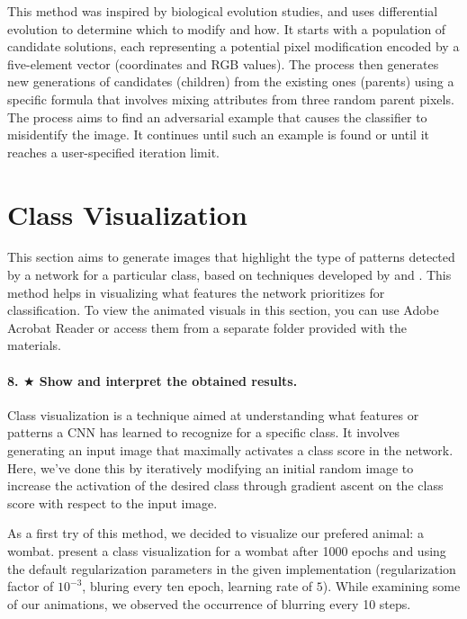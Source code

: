 This method was inspired by biological evolution studies, and uses differential evolution to determine which to modify and how. It starts with a population of candidate solutions, each representing a potential pixel modification encoded by a five-element vector (coordinates and RGB values). The process then generates new generations of candidates (children) from the existing ones (parents) using a specific formula that involves mixing attributes from three random parent pixels. The process aims to find an adversarial example that causes the classifier to misidentify the image. It continues until such an example is found or until it reaches a user-specified iteration limit.

\section{Class Visualization}

This section aims to generate images that highlight the type of patterns detected by a network for a particular class, based on techniques developed by \cite{simonyan2014deep} and \cite{yosinski2015understanding}. This method helps in visualizing what features the network prioritizes for classification. To view the animated visuals in this section, you can use Adobe Acrobat Reader or access them from a separate folder provided with the materials.

\paragraph*{8. $ \bigstar $ Show and interpret the obtained results.}
Class visualization is a technique aimed at understanding what features or patterns a CNN has learned to recognize for a specific class. It involves generating an input image that maximally activates a class score in the network. Here, we've done this by iteratively modifying an initial random image to increase the activation of the desired class through gradient ascent on the class score with respect to the input image.

As a first try of this method, we decided to visualize our prefered animal: a wombat.  present a class visualization for a wombat after 1000 epochs and using the default regularization parameters in the given implementation (regularization factor of $10^{-3}$, bluring every ten epoch, learning rate of $5$). While examining some of our animations, we observed the occurrence of blurring every 10 steps.


